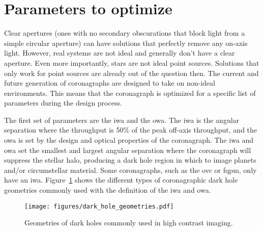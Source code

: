 \documentclass[letterpaper]{ar-1col}
\newcommand{\acc}[1]{\entry{\acs{#1}}{\acl{#1}}}
\begin{document}
\section{Parameters to optimize}

Clear apertures (ones with no secondary obscurations that block light from a simple circular aperture) can have solutions that perfectly remove any on-axis light.
%
However, real systems are not ideal and generally don't have a clear aperture.
%
Even more importantly, stars are not ideal point sources.
%
Solutions that only work for point sources are already out of the question then.
%
The current and future generation of coronagraphs are designed to take on non-ideal environments.
%
This means that the coronagraph is optimized for a specific list of parameters during the design process.

\begin{armarginnote}[]
\acc{iwa}
\acc{owa}
\end{armarginnote}

The first set of parameters are the \ac{iwa} and the \ac{owa}.
%
The \ac{iwa} is the angular separation where the throughput is 50\% of the peak off-axis throughput, and the \ac{owa} is set by the design and optical properties of the coronagraph.
%
The \ac{iwa} and \ac{owa} set the smallest and largest angular separation where the coronagraph will suppress the stellar halo, producing a dark hole region in which to image planets and/or circumstellar material.
%
Some coronagraphs, such as the \ac{ovc} or \ac{fqpm}, only have an \ac{iwa}.
%
Figure~\ref{fig:coronagraph_focal_plane_definitions} shows the different types of coronagraphic dark hole geometries commonly used with the definition of the \ac{iwa} and \ac{owa}.

\begin{figure}[ht]
  \centering
  \texttt{[image: figures/dark\_hole\_geometries.pdf]}
  \caption{Geometries of dark holes commonly used in high contrast imaging.}
  \label{fig:coronagraph_focal_plane_definitions}
\end{figure}
\end{document}
